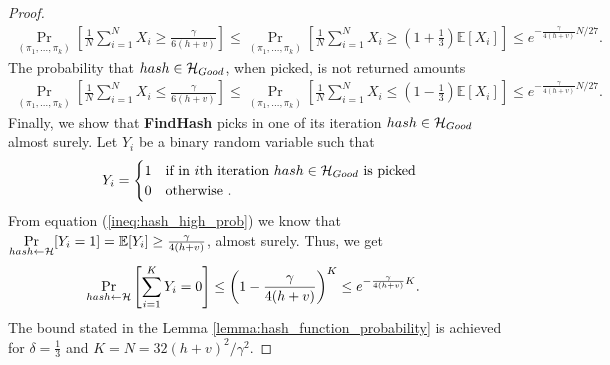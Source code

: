 \begin{proof}
\begin{align*}
  \underset{(\pi_1, \dots, \pi_k)}{\Pr} \left[\frac{1}{N} \sum_{i=1}^{N} X_i \geq \frac{\gamma}{6(h+v)} \right] \leq
  \underset{(\pi_1, \dots, \pi_k)}{\Pr}\left[\frac{1}{N} \sum_{i=1}^{N} X_i \geq (1 + \frac{1}{3}) \mathbb{E}[X_i]\right] \leq
  e^{-{\frac{\gamma}{4(h+v)}} N /27}.
\end{align*}
%
The probability that $hash \in \mathcal{H}_{Good}$, when picked, is not returned amounts
\begin{align*}
  \underset{(\pi_1, \dots, \pi_k)}{\Pr}\left[\frac{1}{N} \sum_{i=1}^{N} X_i \leq \frac{\gamma}{6(h+v)}\right] \leq
  \underset{(\pi_1, \dots, \pi_k)}{\Pr}\left[\frac{1}{N} \sum_{i=1}^{N} X_i \leq (1 - \frac{1}{3})\mathbb{E}[X_i]\right] \leq e^{-{\frac{\gamma}{4(h+v)}} N /27}.
\end{align*}
%
Finally, we show that \textbf{FindHash} picks in one of its iteration $hash \in \mathcal{H}_{Good}$ almost surely.
Let $Y_i$ be a binary random variable such that
\begin{align*}
  Y_i =
  \begin{cases}
    1 & \text{if in $i$th iteration $hash \in \mathcal{H}_{Good}$ is picked} \\
    0 & \text{otherwise .}
  \end{cases}
\end{align*}
From equation (\ref{ineq:hash_high_prob}) we know that $\underset{hash \leftarrow \mathcal{H}}{\Pr}[Y_i = 1] = \mathbb{E}[Y_i] \geq \frac{\gamma}{4(h+v)}$, almost surely.
Thus, we get
\begin{align*}
  \underset{hash \leftarrow \mathcal{H}}{\Pr}\left[\sum_{i=1}^{K} Y_i = 0\right] &\leq \left(1 - \frac{\gamma}{4(h+v)}\right)^{K} \leq e^{-\frac{\gamma}{4(h+v)} K}.
\end{align*}
The bound stated in the Lemma \ref{lemma:hash_function_probability} is achieved for $\delta = \frac{1}{3}$ and $K = N = 32(h+v)^2/\gamma^2$.
\end{proof}
%

